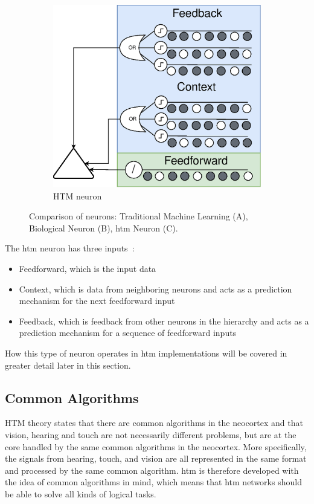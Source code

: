 \begin{figure}[htb]
\begin{subfigure}[b]{0.55\linewidth}
        \includegraphics[width=\linewidth]{resources/related_works/neuron_htm}
        \caption[Comparison of neurons]{HTM neuron}
    \end{subfigure}
    \caption[Comparison of Neurons]{Comparison of neurons: Traditional Machine Learning (A), Biological Neuron (B), \gls*{htm} Neuron (C).}
    \label{fig:neuron_comparison}
\end{figure}
\par
The \gls*{htm} neuron has three inputs~\cite{htm_neurons}:
\begin{itemize}
    \item Feedforward, which is the input data
    \item Context, which is data from neighboring neurons and acts as a prediction mechanism for the next feedforward input
    \item Feedback, which is feedback from other neurons in the hierarchy and acts as a prediction mechanism for a sequence of feedforward inputs
\end{itemize}
How this type of neuron operates in \gls*{htm} implementations will be covered in greater detail later in this section.
\subsection{Common Algorithms}
HTM theory states that there are common algorithms in the neocortex and that vision, hearing and touch are not necessarily different problems, but are at the core handled by the same common algorithms in the neocortex. More specifically, the signals from hearing, touch, and vision are all represented in the same format and processed by the same common algorithm. \gls*{htm} is therefore developed with the idea of common algorithms in mind, which means that \gls*{htm} networks should be able to solve all kinds of logical tasks.
